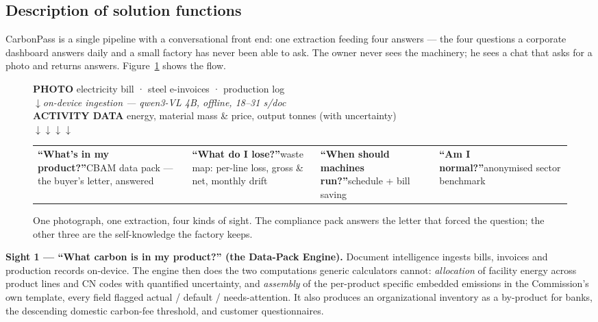\documentclass[11pt]{article}
\begin{document}
\clearpage
\subsection{Description of solution functions}
CarbonPass is a single pipeline with a conversational front end: one extraction feeding four answers --- the four questions a corporate dashboard answers daily and a small factory has never been able to ask. The owner never sees the machinery; he sees a chat that asks for a photo and returns answers. Figure~\ref{fig:pipe} shows the flow.

\begin{figure}[h]
\centering
\footnotesize
\setlength{\fboxsep}{7pt}
\colorbox{rowg}{\begin{minipage}{0.96\textwidth}
\centering\sffamily
\textbf{PHOTO} \; electricity bill · steel e-invoices · production log\\
$\downarrow$\quad\emph{on-device ingestion --- qwen3-VL 4B, offline, 18--31 s/doc}\\
\textbf{ACTIVITY DATA} \; energy, material mass \& price, output tonnes (with uncertainty)\\[2pt]
$\downarrow$\hspace{5em}$\downarrow$\hspace{5em}$\downarrow$\hspace{5em}$\downarrow$\\[2pt]
\begin{tabular}{p{} p{} p{} p{}}
\centering\textbf{``What's in my product?''}\newline\footnotesize CBAM data pack --- the buyer's letter, answered &
\centering\textbf{``What do I lose?''}\newline\footnotesize waste map: per-line loss, gross \& net, monthly drift &
\centering\textbf{``When should machines run?''}\newline\footnotesize schedule + bill saving &
\centering\textbf{``Am I normal?''}\newline\footnotesize anonymised sector benchmark \tabularnewline
\end{tabular}
\end{minipage}}
\caption{One photograph, one extraction, four kinds of sight. The compliance pack answers the letter that forced the question; the other three are the self-knowledge the factory keeps.}
\label{fig:pipe}
\end{figure}

\textbf{Sight 1 --- ``What carbon is in my product?'' (the Data-Pack Engine).} Document intelligence ingests bills, invoices and production records on-device. The engine then does the two computations generic calculators cannot: \emph{allocation} of facility energy across product lines and CN codes with quantified uncertainty, and \emph{assembly} of the per-product specific embedded emissions in the Commission's own template, every field flagged actual / default / needs-attention. It also produces an organizational inventory as a by-product for banks, the descending domestic carbon-fee threshold, and customer questionnaires.
\end{document}
